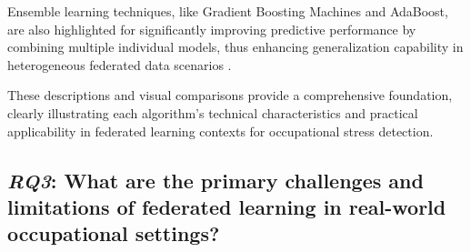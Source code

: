 \documentclass[12pt]{article}
\begin{document}
Ensemble learning techniques, like Gradient Boosting Machines and AdaBoost, are also highlighted for significantly improving predictive performance by combining multiple individual models, thus enhancing generalization capability in heterogeneous federated data scenarios \cite{abdulrahman_alahmadi_32bc288c}.

\begin{table}[H]
\centering
\caption{Visual comparison of commonly employed machine learning algorithms in federated learning for occupational stress analysis.}
\label{tab:algorithms_comparison}
\end{table}

These descriptions and visual comparisons provide a comprehensive foundation, clearly illustrating each algorithm's technical characteristics and practical applicability in federated learning contexts for occupational stress detection.

\subsection{\textit{RQ3}: What are the primary challenges and limitations of federated learning in real-world occupational settings?}
\end{document}
